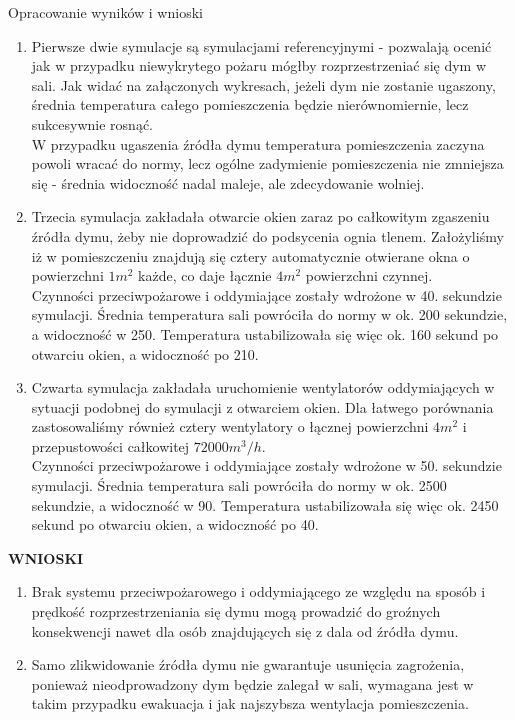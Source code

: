 \documentclass[a4paper, 12pt]{scrartcl}
\begin{document}
	\begin{section}{Opracowanie wyników i wnioski}
		\begin{enumerate}
			\item Pierwsze dwie symulacje są symulacjami referencyjnymi - pozwalają ocenić jak w przypadku niewykrytego pożaru mógłby rozprzestrzeniać się dym w sali. Jak widać na załączonych wykresach, jeżeli dym nie zostanie ugaszony, średnia temperatura całego pomieszczenia będzie nierównomiernie, lecz sukcesywnie rosnąć. \\
			W przypadku ugaszenia źródła dymu temperatura pomieszczenia zaczyna powoli wracać do normy, lecz ogólne zadymienie pomieszczenia nie zmniejsza się - średnia widoczność nadal maleje, ale zdecydowanie wolniej.
			\item Trzecia symulacja zakładała otwarcie okien zaraz po całkowitym zgaszeniu źródła dymu, żeby nie doprowadzić do podsycenia ognia tlenem. Założyliśmy iż w pomieszczeniu znajdują się cztery automatycznie otwierane okna o powierzchni $ 1m^2 $ każde, co daje łącznie $ 4m^2 $ powierzchni czynnej. \\
			Czynności przeciwpożarowe i oddymiające zostały wdrożone w 40. sekundzie symulacji. Średnia temperatura sali powróciła do normy w ok. 200 sekundzie, a widoczność w 250. Temperatura ustabilizowała się więc ok. 160 sekund po otwarciu okien, a widoczność po 210.
			\item Czwarta symulacja zakładała uruchomienie wentylatorów oddymiających w sytuacji podobnej do symulacji z otwarciem okien. Dla łatwego porównania zastosowaliśmy również cztery wentylatory o łącznej powierzchni $ 4m^2 $ i przepustowości całkowitej $ 72000 m^3/h $. \\
			Czynności przeciwpożarowe i oddymiające zostały wdrożone w 50. sekundzie symulacji. Średnia temperatura sali powróciła do normy w ok. 2500 sekundzie, a widoczność w 90. Temperatura ustabilizowała się więc ok. 2450 sekund po otwarciu okien, a widoczność po 40.
		\end{enumerate}
		\textbf{WNIOSKI}
		\begin{enumerate}
			\item Brak systemu przeciwpożarowego i oddymiającego ze względu na sposób i prędkość rozprzestrzeniania się dymu mogą prowadzić do groźnych konsekwencji nawet dla osób znajdujących się z dala od źródła dymu.
			\item Samo zlikwidowanie źródła dymu nie gwarantuje usunięcia zagrożenia, ponieważ nieodprowadzony dym będzie zalegał w sali, wymagana jest w takim przypadku ewakuacja i jak najszybsza wentylacja pomieszczenia.

\end{enumerate}
\end{section}
\end{document}
